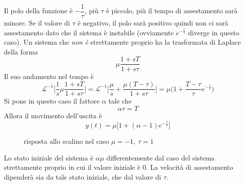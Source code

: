 \documentclass[10pt, letterpaper]{report}
\begin{document}
Il polo della funzione è $-\dfrac{1}{\tau}$, più $\tau$ è 
piccolo, più il tempo di assestamento sarà minore. Se il valore 
di $\tau$ è negativo, il polo sarà positivo quindi 
non ci sarà assestamento dato che il sistema è instabile
(ovviamente $e^{-\frac{t}{\tau}}$ diverge in questo caso).
\acc
Un sistema che \textit{non è} strettamente proprio ha la trasformata di Laplace 
della forma 
$$ \mu\frac{1+sT}{1+s\tau}$$
Il suo andamento nel tempo è 
$$\mathcal{L}^{-1}\Big[ \frac{1}{s}\mu\frac{1+sT}{1+s\tau}\Big]=
\mathcal{L}^{-1}\Big[
\frac{\mu}{s}+\frac{\mu(T-\tau)}{1+s\tau}    
\Big]=
\mu\Big(1+\frac{T-\tau}{\tau}e^{-\frac{t}{\tau}}\Big)$$
Si pone in questo caso il fattore $\alpha$ tale che 
$$ \alpha\tau=T$$
Allora il movimento dell'uscita è 
$$ y(t)=\mu\Big[
1+(\alpha-1)e^{-\frac{t}{\tau}}    
\Big]$$
\begin{center}
    \begin{figure}[h!]
        \centering
            \caption{risposta allo scalino nel caso $\mu = -1, \ \tau=1$}
    \end{figure}
    \end{center}
Lo stato iniziale del sistema è $\alpha\mu$ differentemente dal 
caso del sistema strettamente proprio in cui il valore 
iniziale è 0.
La velocità di assestamento dipenderà sia da tale stato 
iniziale, che 
dal valore di $\tau$.
\end{document}
